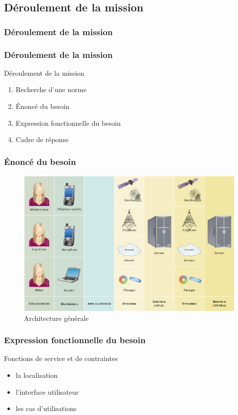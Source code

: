 \subsection{Déroulement de la mission}

\subsubsection{Déroulement de la mission}

\begin{frame}
\frametitle{Déroulement de la mission}
\begin{block}{Déroulement de la mission}
	\begin{enumerate}
	\item Recherche d'une norme
	\item Énoncé du besoin
	\item Expression fonctionnelle du besoin
	\item Cadre de réponse
	\end{enumerate}
	\end{block}
\end{frame}
  
\begin{frame}
	\frametitle{Énoncé du besoin}
	\begin{figure}[htbp]
	\centering
	\includegraphics[scale=0.35]{Images/architecture.png}
	\caption{Architecture générale}
	\end{figure}
\end{frame}

\begin{frame}
\frametitle{Expression fonctionnelle du besoin}
\begin{block}{Fonctions de service et de contraintes}
\begin{itemize}
\item la localisation
\item l'interface utilisateur
\item les cas d'utilisations
\end{itemize}
\end{block}
\end{frame}

